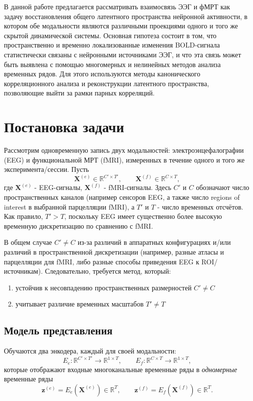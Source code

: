 \documentclass[12pt]{article}
\begin{document}
В данной работе предлагается рассматривать взаимосвязь ЭЭГ и фМРТ как задачу восстановления общего латентного пространства нейронной активности, в котором обе модальности являются различными проекциями одного и того же скрытой динамической системы. Основная гипотеза состоит в том, что пространственно и временно локализованные изменения BOLD-сигнала статистически связаны с нейронными источниками ЭЭГ, и что эта связь может быть выявлена с помощью многомерных и нелинейных методов анализа временных рядов. Для этого используются методы канонического корреляционного анализа и реконструкции латентного пространства, позволяющие выйти за рамки парных корреляций. 

\section{Постановка задачи}

Рассмотрим одновременную запись двух модальностей: электроэнцефалографии (EEG) и функциональной МРТ (fMRI), измеренных в течение одного и того же эксперимента/сессии.
Пусть
\[
\mathbf{X}^{(e)} \in \mathbb{R}^{C' \times T'}, 
\qquad
\mathbf{X}^{(f)} \in \mathbb{R}^{C \times T},
\]
где $\mathbf{X}^{(e)}$ - EEG-сигналы, $\mathbf{X}^{(f)}$ - fMRI-сигналы.
Здесь $C'$ и $C$ обозначают число пространственных каналов (например сенсоров EEG, а также число regions of interest в выбранной парцелляции fMRI), а $T'$ и $T$ - число временных отсчётов.
Как правило, $T' > T$, поскольку EEG имеет существенно более высокую временную дискретизацию по сравнению с fMRI.

В общем случае $C' \neq C$ из-за различий в аппаратных конфигурациях и/или различий в пространственной дискретизации (например, разные атласы и парцелляции для fMRI, либо разные способы приведения EEG к ROI/источникам).
Следовательно, требуется метод, который:
\begin{enumerate}
    \item устойчив к несовпадению пространственных размерностей $C' \neq C$
    \item учитывает различие временных масштабов $T' \neq T$
\end{enumerate}

\subsection{Модель представления}

Обучаются два энкодера, каждый для своей модальности:
\[
E_e:\mathbb{R}^{C' \times T'} \to \mathbb{R}^{1 \times T},
\qquad
E_f:\mathbb{R}^{C \times T} \to \mathbb{R}^{1 \times T},
\]
которые отображают входные многоканальные временные ряды в \emph{одномерные} временные ряды
\[
\mathbf{z}^{(e)} = E_e(\mathbf{X}^{(e)}) \in \mathbb{R}^{T},
\qquad
\mathbf{z}^{(f)} = E_f(\mathbf{X}^{(f)}) \in \mathbb{R}^{T}.
\]
\end{document}
